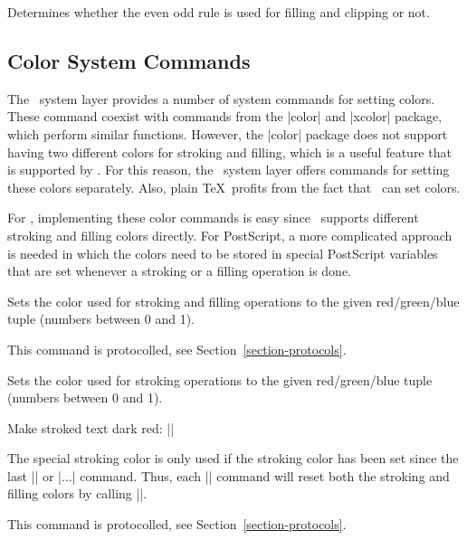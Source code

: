 {\let\ifpgfsys@eorule=\relax
\begin{command}{\ifpgfsys@eorule}
    Determines whether the even odd rule is used for filling and clipping or
    not.
\end{command}
}


\subsection{Color System Commands}

The \pgfname\ system layer provides a number of system commands for setting
colors. These command coexist with commands from the |color| and |xcolor|
package, which perform similar functions. However, the |color| package does not
support having two different colors for stroking and filling, which is a useful
feature that is supported by \pgfname. For this reason, the \pgfname\ system
layer offers commands for setting these colors separately. Also, plain \TeX\
profits from the fact that \pgfname\ can set colors.

For \pdf, implementing these color commands is easy since \pdf\ supports
different stroking and filling colors directly. For PostScript, a more
complicated approach is needed in which the colors need to be stored in special
PostScript variables that are set whenever a stroking or a filling operation is
done.

\begin{command}{\pgfsys@color@rgb{}}
    Sets the color used for stroking and filling operations to the given
    red/green/blue tuple (numbers between 0 and 1).

    This command is protocolled, see Section~\ref{section-protocols}.
\end{command}

\begin{command}{\pgfsys@color@rgb@stroke{}}
    Sets the color used for stroking operations to the given red/green/blue
    tuple (numbers between 0 and 1).

    \example Make stroked text dark red: ||

    The special stroking color is only used if the stroking color has been set
    since the last |\color| or |\pgfsys@color@...| command. Thus, each |\color|
    command will reset both the stroking and filling colors by calling
    |\pgfsys@color@reset|.

    This command is protocolled, see Section~\ref{section-protocols}.
\end{command}

